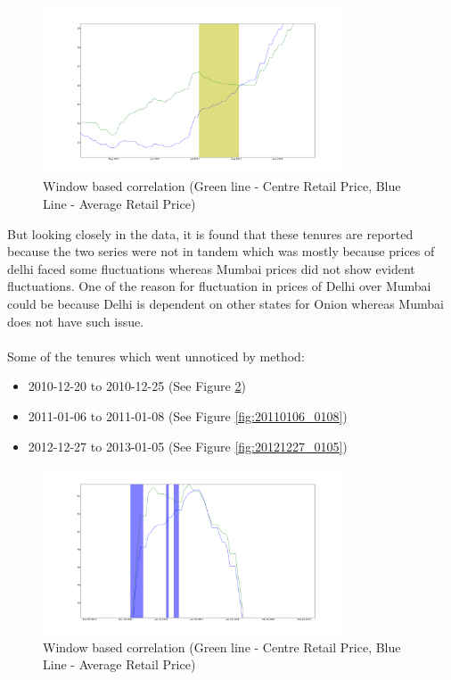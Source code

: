 \begin{itemize}
			\begin{figure}[H]
		    	\centering
  		    	\includegraphics[width=0.8\textwidth]{graphs/20110704_0802.png}
		    	\caption{Window based correlation (Green line - Centre Retail Price, Blue Line - Average Retail Price)}
		    	\label{fig:20110704_0802}
			\end{figure}
			
			But looking closely in the data, it is found that these tenures are reported because the two series were not in tandem which was mostly because prices of delhi faced some fluctuations whereas Mumbai prices did not show evident fluctuations. One of the reason for fluctuation in prices of Delhi over Mumbai could be because Delhi is dependent on other states for Onion whereas Mumbai does not have such issue.
			\\
			\\
			Some of the tenures which went unnoticed by method:
			
			\begin{itemize}
				\item 2010-12-20 to 2010-12-25 (See Figure \ref{fig:20101220_1225})
				\item 2011-01-06 to 2011-01-08 (See Figure \ref{fig:20110106_0108})
				\item 2012-12-27 to 2013-01-05 (See Figure \ref{fig:20121227_0105})
			\end{itemize}
			\begin{figure}[H]
		    	\centering
  		    	\includegraphics[width=0.8\textwidth]{graphs/20101220_1225.png}
		    	\caption{Window based correlation (Green line - Centre Retail Price, Blue Line - Average Retail Price)}
		    	\label{fig:20101220_1225}
			\end{figure}
			

\end{itemize}
